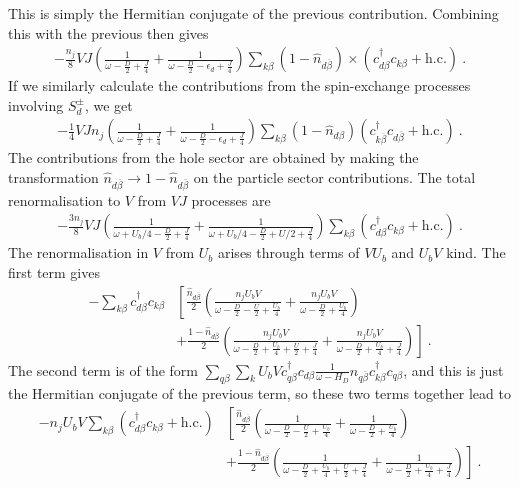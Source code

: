 \documentclass{iopart}
\begin{document}
This is simply the Hermitian conjugate of the previous contribution. Combining this with the previous then gives
\begin{eqnarray}
	-\frac{n_j}{8}V J \left(\frac{1}{\omega - \frac{D}{2} + \frac{J}{4}} + \frac{1}{\omega - \frac{D}{2} - \epsilon_d + \frac{J}{4}}\right) \sum_{k\beta}\left(1 - \hat n_{d\overline\beta}\right) \times\left(c^\dagger_{d\beta} c_{k\beta} + \text{h.c.}\right)~.
\end{eqnarray}
If we similarly calculate the contributions from the spin-exchange processes involving \(S_d^\pm\), we get
\begin{eqnarray}
	-\frac{1}{4}V J n_j \left(\frac{1}{\omega - \frac{D}{2} + \frac{J}{4}} + \frac{1}{\omega - \frac{D}{2} - \epsilon_d + \frac{J}{4}}\right) \sum_{k\beta} \left(1 - \hat n_{d\beta}\right)  \left(c^\dagger_{k\overline\beta} c_{d\overline\beta} + \text{h.c.}\right)~.
\end{eqnarray}
The contributions from the hole sector are obtained by making the transformation \(\hat n_{d\overline\beta} \to 1 - \hat n_{d\overline\beta}\) on the particle sector contributions. The total renormalisation to \(V\) from \(VJ\) processes are
\begin{eqnarray}
	-\frac{3n_j}{8}V J \left(\frac{1}{\omega +U_b/4 - \frac{D}{2} + \frac{J}{4}} + \frac{1}{\omega +U_b/4 - \frac{D}{2} + U/2 + \frac{J}{4}}\right)\sum_{k\beta}\left(c^\dagger_{d\beta} c_{k\beta} + \text{h.c.}\right)~.
\end{eqnarray}
The renormalisation in \(V\) from \(U_b\) arises through terms of \(V U_b\) and \(U_b V\) kind. The first term gives
\begin{eqnarray}
	-\sum_{k\beta} c^\dagger_{d\beta} c_{k\beta} &\left[\frac{\hat n_{d\overline\beta}}{2}\left(\frac{n_jU_b V}{\omega - \frac{D}{2} - \frac{U}{2} + \frac{U_b}{4}} + \frac{n_jU_b V}{\omega - \frac{D}{2} + \frac{U_b}{4}}\right) \right.\nonumber\\
						     &\left.+ \frac{1-\hat n_{d\overline\beta}}{2}\left(\frac{n_jU_b V}{\omega - \frac{D}{2} + \frac{U_b}{4} + \frac{U}{2} + \frac{J}{4}} + \frac{n_jU_b V}{\omega - \frac{D}{2} + \frac{U_b}{4} + \frac{J}{4}}\right)\right]~.
\end{eqnarray}
The second term is of the form \(\sum_{q\beta}\sum_{k}U_b V c^\dagger_{q\beta}c_{d\beta} \frac{1}{\omega - H_D} \hat n_{q\overline\beta} c^\dagger_{k\beta}c_{q\beta}\),
and this is just the Hermitian conjugate of the previous term, so these two terms together lead to
\begin{eqnarray}
	-n_jU_b V\sum_{k\beta} \left(c^\dagger_{d\beta} c_{k\beta} + \text{h.c.}\right)&\left[\frac{\hat n_{d\overline\beta}}{2}\left(\frac{1}{\omega - \frac{D}{2} - \frac{U}{2} + \frac{U_b}{4}} + \frac{1}{\omega - \frac{D}{2} + \frac{U_b}{4}}\right) \right.\nonumber\\
											     &\left. + \frac{1-\hat n_{d\overline\beta}}{2}\left(\frac{1}{\omega - \frac{D}{2} + \frac{U_b}{4} + \frac{U}{2} + \frac{J}{4}} +\frac{1}{\omega - \frac{D}{2} + \frac{U_b}{4} + \frac{J}{4}}\right)\right]~.
\end{eqnarray}
\end{document}
